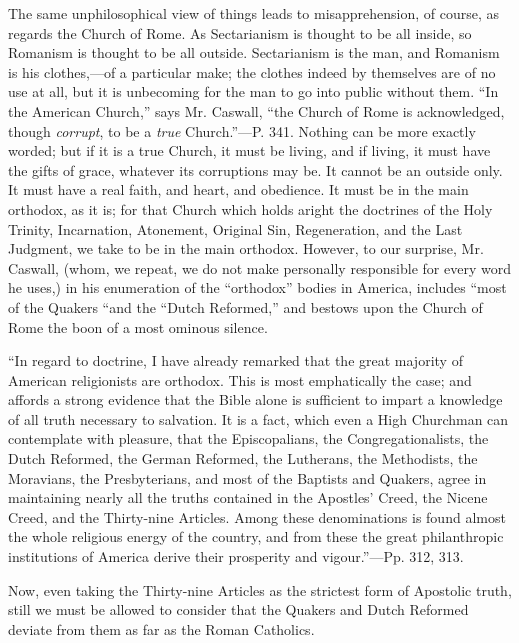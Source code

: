 The same unphilosophical view of things leads to
misapprehension, of course, as regards the Church of Rome. As
Sectarianism is thought to be all inside, so Romanism is thought to be
all outside. Sectarianism is the man, and Romanism is his
clothes,—of a particular make; the clothes indeed by themselves are
of no use at all, but it is unbecoming for the man to go into public
without them. ``In the American Church,'' says Mr. Caswall, ``the Church
of Rome is acknowledged, though \emph{corrupt}, to be a \emph{true} Church.''—P.
341. Nothing can be more exactly worded; but if it is a true Church,
it must be living, and if living, it must have the gifts of grace,
whatever its corruptions may be. It cannot be an outside only. It must
have a real faith, and heart, and obedience. It must be in the main
orthodox, as it is; for that Church which holds aright the doctrines
of the Holy Trinity, Incarnation, Atonement, Original Sin,
Regeneration, and the Last Judgment, we take to be in the main
orthodox. However, to our surprise, Mr. Caswall, (whom, we repeat, we
do not make personally responsible for every word he uses,) in his
enumeration of the ``orthodox'' bodies in America, includes ``most of the
Quakers ``and the ``Dutch Reformed,'' and bestows upon the Church of Rome
the boon of a most ominous silence.

``In
regard to doctrine, I have already remarked that the great majority of
American religionists are orthodox. This is most emphatically the
case; and affords a strong evidence that the Bible alone is sufficient
to impart a knowledge of all truth necessary to salvation. It is a
fact, which even a High Churchman can contemplate with pleasure, that
the Episcopalians, the Congregationalists, the Dutch Reformed, the
German Reformed, the Lutherans, the Methodists, the Moravians, the
Presbyterians, and most of the Baptists and Quakers, agree in
maintaining nearly all the truths contained in the Apostles' Creed,
the Nicene Creed, and the Thirty-nine Articles. Among these
denominations is found almost the whole religious energy of the
country, and from these the great philanthropic institutions of
America derive their prosperity and vigour.''—Pp. 312, 313.

Now, even taking the Thirty-nine Articles as the
strictest form of Apostolic truth, still we must be allowed to
consider that the Quakers and Dutch Reformed deviate from them as far
as the Roman Catholics.

